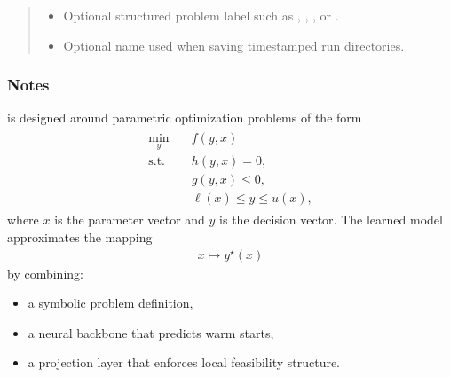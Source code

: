 \documentclass[letterpaper,10pt,english,openany,oneside]{sphinxmanual}
\begin{document}
\begin{fulllineitems}
\begin{quote}
\begin{description}
\begin{itemize}
\item {} 
\sphinxAtStartPar
{} \textendash{} Optional structured problem label such as , , ,
or .

\item {} 
\sphinxAtStartPar
{} \textendash{} Optional name used when saving timestamped run directories.

\end{itemize}

\end{description}\end{quote}
\subsubsection*{Notes}

\sphinxAtStartPar
{} is designed around parametric optimization problems of the
form
\begin{equation*}
\begin{split}\begin{aligned}
    \min_y \quad & f(y, x) \\
    \text{s.t.}\quad & h(y, x) = 0, \\
    & g(y, x) \le 0, \\
    & \ell(x) \le y \le u(x),
\end{aligned}\end{split}
\end{equation*}
\sphinxAtStartPar
where \(x\) is the parameter vector and \(y\) is the decision
vector. The learned model approximates the mapping
\begin{equation*}
\begin{split}x \mapsto y^\star(x)\end{split}
\end{equation*}
\sphinxAtStartPar
by combining:
\begin{itemize}
\item {} 
\sphinxAtStartPar
a symbolic problem definition,

\item {} 
\sphinxAtStartPar
a neural backbone that predicts warm starts,

\item {} 
\sphinxAtStartPar
a projection layer that enforces local feasibility structure.


\end{itemize}
\end{fulllineitems}
\end{document}
